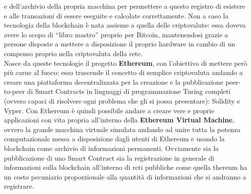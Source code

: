 e dell’archivio della propria macchina per permettere a questo registro di esistere
e alle transazioni di essere eseguite e calcolate correttamente.
Non a caso la tecnologia della blockchain è nata assieme a quella delle criptovalute:
essa doveva avere lo scopo di “libro mastro” proprio per Bitcoin, mantenendosi grazie a persone
disposte a mettere a disposizione il proprio hardware in cambio di un compenso
proprio  nella criptovaluta della rete.
\\
\label{sub:eth}
Nasce da queste tecnologie il progetto \textbf{Ethereum}, con l’obiettivo di mettere però
più carne al fuoco: esso trascende il concetto di semplice criptovaluta andando a creare
una piattaforma decentralizzata per la creazione e la pubblicazione peer-to-peer di Smart Contracts
in linguaggi di programmazione Turing completi (ovvero capaci di risolvere ogni problema
che gli si possa presentare): Solidity e Vyper.
Con Ethereum è quindi possibile andare a creare vere e proprie applicazioni
con vita propria all’interno della \textbf{Ethereum Virtual Machine},
ovvero la grande macchina virtuale simulata andando ad unire tutta la potenza computazionale
messa a disposizione dagli utenti di Ethereum e usando la blockchain come archivio di
informazioni permanenti. Ovviamente sia la pubblicazione di uno Smart Contract sia la registrazione
in generale di informazioni sulla blockchain all’interno di reti pubbliche come quella
thereum ha un costo pecuniario proporzionale alla quantità di informazioni che si andranno a registrare.

